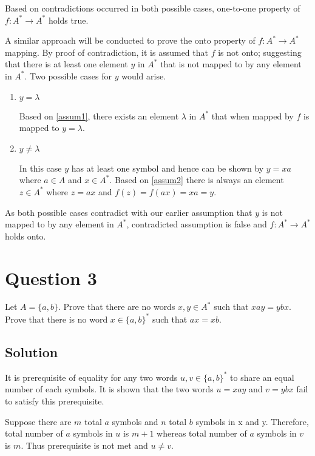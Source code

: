Based on contradictions occurred in both possible cases, one-to-one property of $f:A^*\rightarrow A^*$ holds true.

A similar approach will be conducted to prove the onto property of $f:A^*\rightarrow A^*$ mapping.
By proof of contradiction, it is assumed that $f$ is not onto; suggesting that there is at least one element $y$ in $A^*$ that is not mapped to by any element in $A^*$.
Two possible cases for $y$ would arise.

\begin{enumerate}[label=(\alph*)]
\item $y = \lambda$

Based on \eqref{assum1}, there exists an element $\lambda$ in $A^*$ that when mapped by $f$ is mapped to $y = \lambda$.
\item $y \neq \lambda$

In this case $y$ has at least one symbol and hence can be shown by $y=xa$ where $a \in A$ and $x \in A^*$.
Based on \eqref{assum2} there is always an element $z \in A^*$ where $z = ax$ and $f(z) = f(ax) = xa = y$.

\end{enumerate}

As both possible cases contradict with our earlier assumption that $y$ is not mapped to by any element in $A^*$, contradicted assumption is false and $f:A^*\rightarrow A^*$ holds onto.

\section*{Question 3}

Let $A = \{a,b\}$.
Prove that there are no words $x, y \in A^*$ such that $xay = ybx$.
Prove that there is no word $x \in \{a,b\}^*$ such that $ax = xb$.

\subsection*{Solution}

It is prerequisite of equality for any two words $u, v \in \{a,b\}^*$ to share an equal number of each symbols.
It is shown that the two words $u=xay$ and $v=ybx$ fail to satisfy this prerequisite.

Suppose there are $m$ total $a$ symbols and $n$ total $b$ symbols in x and y.
Therefore, total number of $a$ symbols in $u$ is $m+1$ whereas total number of $a$ symbols in $v$ is $m$.
Thus prerequisite is not met and $u \neq v$.


